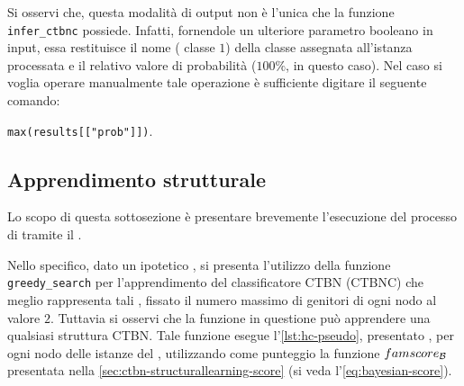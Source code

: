 \vspace*{8pt}\vspace*{8pt}

Si osservi che, questa modalità di output non è l'unica che la funzione \lstinline[language=rstats]{infer_ctbnc} possiede. Infatti, fornendole un ulteriore parametro booleano in input, essa restituisce il nome (\ie{} classe $1$) della classe assegnata all'istanza processata e il relativo valore di probabilità ($100\%$, in questo caso). Nel caso si voglia operare manualmente tale operazione è sufficiente digitare il seguente comando:

\lstinline[language=rstats]{max(results[["prob"]])}.

\subsection{Apprendimento strutturale}
Lo scopo di questa sottosezione è presentare brevemente l'esecuzione del processo di \emph{} tramite il \pacchettor{}.

Nello specifico, dato un ipotetico \emph{}, si presenta l'utilizzo della funzione \lstinline[language=rstats]{greedy_search} per l'apprendimento del classificatore \acs{CTBN} (\acs{CTBNC}) che meglio rappresenta tali , fissato il numero massimo di genitori di ogni nodo al valore $2$. Tuttavia si osservi che la funzione in questione può apprendere una qualsiasi struttura \acs{CTBN}. Tale funzione esegue l'\autoref{lst:hc-pseudo}, presentato , per ogni nodo delle istanze del \emph{}, utilizzando come punteggio la funzione $famscore_{\mathcal{B}}$ presentata nella \vref{sec:ctbn-structurallearning-score} (si veda l'\autoref{eq:bayesian-score}).

